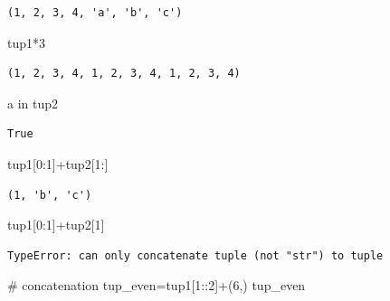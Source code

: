 \documentclass[
  letterpaper,
  DIV=11,
  numbers=noendperiod]{scrreprt}
\newenvironment{Shaded}{\begin{snugshade}}{\end{snugshade}}
\newcommand{\CommentTok}[1]{\textcolor[rgb]{0.37,0.37,0.37}{#1}}
\newcommand{\DecValTok}[1]{\textcolor[rgb]{0.68,0.00,0.00}{#1}}
\newcommand{\KeywordTok}[1]{\textcolor[rgb]{0.00,0.23,0.31}{#1}}
\newcommand{\NormalTok}[1]{\textcolor[rgb]{0.00,0.23,0.31}{#1}}
\newcommand{\OperatorTok}[1]{\textcolor[rgb]{0.37,0.37,0.37}{#1}}
\begin{document}
\begin{verbatim}
(1, 2, 3, 4, 'a', 'b', 'c')
\end{verbatim}

\begin{Shaded}
\begin{Highlighting}[]
\NormalTok{tup1}\OperatorTok{*}\DecValTok{3}
\end{Highlighting}
\end{Shaded}

\begin{verbatim}
(1, 2, 3, 4, 1, 2, 3, 4, 1, 2, 3, 4)
\end{verbatim}

\begin{Shaded}
\begin{Highlighting}[]
\CommentTok{\textquotesingle{}a\textquotesingle{}} \KeywordTok{in}\NormalTok{ tup2}
\end{Highlighting}
\end{Shaded}

\begin{verbatim}
True
\end{verbatim}

\begin{Shaded}
\begin{Highlighting}[]
\NormalTok{tup1[}\DecValTok{0}\NormalTok{:}\DecValTok{1}\NormalTok{]}\OperatorTok{+}\NormalTok{tup2[}\DecValTok{1}\NormalTok{:]}
\end{Highlighting}
\end{Shaded}

\begin{verbatim}
(1, 'b', 'c')
\end{verbatim}

\begin{Shaded}
\begin{Highlighting}[]
\NormalTok{tup1[}\DecValTok{0}\NormalTok{:}\DecValTok{1}\NormalTok{]}\OperatorTok{+}\NormalTok{tup2[}\DecValTok{1}\NormalTok{]}
\end{Highlighting}
\end{Shaded}

\begin{verbatim}
TypeError: can only concatenate tuple (not "str") to tuple
\end{verbatim}

\begin{Shaded}
\begin{Highlighting}[]
\CommentTok{\# concatenation}
\NormalTok{tup\_even}\OperatorTok{=}\NormalTok{tup1[}\DecValTok{1}\NormalTok{::}\DecValTok{2}\NormalTok{]}\OperatorTok{+}\NormalTok{(}\DecValTok{6}\NormalTok{,)}
\NormalTok{tup\_even}
\end{Highlighting}
\end{Shaded}
\end{document}
